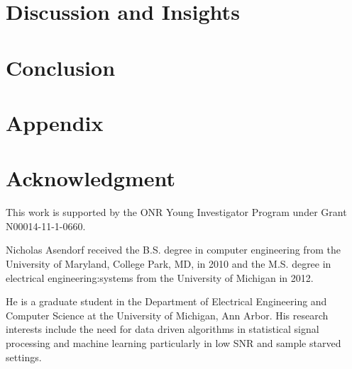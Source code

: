 \documentclass[10pt,twocolumn,twoside]{IEEEtran}
\begin{document}
\section{Discussion and Insights}\label{sec:results}


\section{Conclusion}\label{sec:conclusion}


\section*{Appendix}


\section*{Acknowledgment}

This work is supported by the ONR Young Investigator Program under Grant N00014-11-1-0660.


\ifCLASSOPTIONcaptionsoff
  \newpage
\fi




%
\begin{biography}{Nicholas
  Asendorf}
received the B.S. degree in computer engineering from the University of Maryland, College Park, MD, in 2010 and the M.S. degree in electrical engineering:systems from the University of Michigan in 2012.

He is a graduate student in the Department of Electrical Engineering and Computer Science at the University of Michigan, Ann Arbor. His research interests include the need for data driven algorithms in statistical signal processing and machine learning particularly in low SNR and sample starved settings.

\end{biography}
\end{document}
